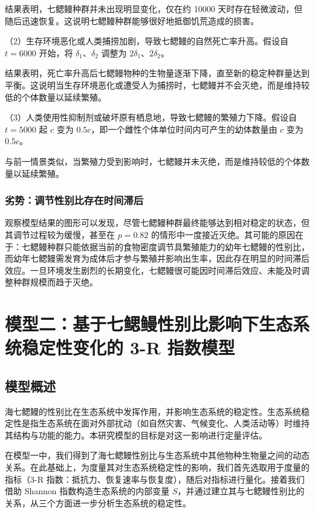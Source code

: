 \documentclass[11pt,a4paper]{ctexart}
\begin{document}
结果表明，七鳃鳗种群并未出现明显变化，仅在约 10000 天时存在轻微波动，但随后迅速恢复。这说明七鳃鳗种群能够很好地抵御饥荒造成的损害。

（2）生存环境恶化或人类捕捞加剧，导致七鳃鳗的自然死亡率升高。假设自 $t=6000$ 开始，将 $\delta_1$、$\delta_2$ 调整为 $2\delta_1$、$2\delta_2$。

结果表明，死亡率升高后七鳃鳗物种的生物量逐渐下降，直至新的稳定种群量达到平衡。这说明当生存环境恶化或遭受人为捕捞时，七鳃鳗并不会灭绝，而是维持较低的个体数量以延续繁殖。

（3）人类使用性抑制剂或破坏原有栖息地，导致七鳃鳗的繁殖力下降。假设自 $t=5000$ 起 $c$ 变为 $0.5c$，即一个雌性个体单位时间内可产生的幼体数量由 $c$ 变为 $0.5c$。

与前一情景类似，当繁殖力受到影响时，七鳃鳗并未灭绝，而是维持较低的个体数量以延续繁殖。

\subsubsection{劣势：调节性别比存在时间滞后}

观察模型结果的图形可以发现，尽管七鳃鳗种群最终能够达到相对稳定的状态，但其调节过程较为缓慢，甚至在 $p=0.82$ 的情形中一度接近灭绝。其可能的原因在于：七鳃鳗种群只能依据当前的食物密度调节具繁殖能力的幼年七鳃鳗的性别比，而幼年七鳃鳗需发育为成体后才参与繁殖并影响出生率，因此存在明显的时间滞后效应。一旦环境发生剧烈的长期变化，七鳃鳗很可能因时间滞后效应、未能及时调整种群规模而趋于灭绝。

\section{模型二：基于七鳃鳗性别比影响下生态系统稳定性变化的 3-R 指数模型}

\subsection{模型概述}

海七鳃鳗的性别比在生态系统中发挥作用，并影响生态系统的稳定性。生态系统稳定性是指生态系统在面对外部扰动（如自然灾害、气候变化、人类活动等）时维持其结构与功能的能力。本研究模型的目标是对这一影响进行定量评估。

在模型一中，我们得到了海七鳃鳗性别比与生态系统中其他物种生物量之间的动态关系。在此基础上，为度量其对生态系统稳定性的影响，我们首先选取用于度量的指标（3-R 指数：抵抗力、恢复速率与恢复度），随后对指标进行量化。接着我们借助 Shannon 指数\cite{17}构造生态系统的内部变量 $S$，并通过建立其与七鳃鳗性别比的关系，从三个方面进一步分析生态系统的稳定性。
\end{document}
